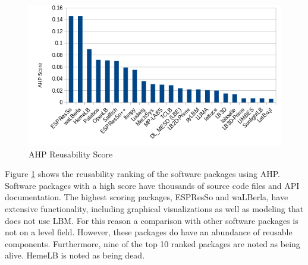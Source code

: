 \documentclass[12pt, notitlepage]{article}
\begin{document}
\begin{figure}[h!]
	\begin{center}
		\includegraphics[width=1.0\textwidth]{reusability_chart}
		\caption{AHP Reusability Score}
		\label{Fig_Reusabilty}
	\end{center}
\end{figure}

Figure \ref{Fig_Reusabilty} shows the reusability ranking of the software packages using AHP. Software packages with a high score have thousands of source code files and API documentation. The highest scoring packages, ESPResSo and waLBerla, have extensive functionality, including graphical visualizations as well as modeling that does not use LBM. For this reason a comparison with other software packages is not on a level field. However, these packages do have an abundance of reusable components. Furthermore, nine of the top 10 ranked packages are noted as being alive. HemeLB is noted as being dead.
\end{document}
